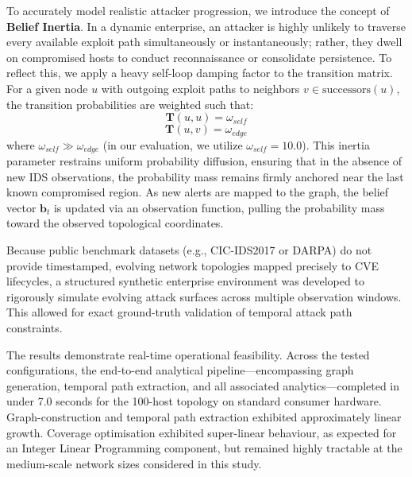 To accurately model realistic attacker progression, we introduce the concept of \textbf{Belief Inertia}. In a dynamic enterprise, an attacker is highly unlikely to traverse every available exploit path simultaneously or instantaneously; rather, they dwell on compromised hosts to conduct reconnaissance or consolidate persistence. To reflect this, we apply a heavy self-loop damping factor to the transition matrix. For a given node $u$ with outgoing exploit paths to neighbors $v \in \text{successors}(u)$, the transition probabilities are weighted such that:
\begin{equation}
    \mathbf{T}(u, u) = \omega_{self}
\end{equation}
\begin{equation}
    \mathbf{T}(u, v) = \omega_{edge}
\end{equation}
where $\omega_{self} \gg \omega_{edge}$ (in our evaluation, we utilize $\omega_{self} = 10.0$). This inertia parameter restrains uniform probability diffusion, ensuring that in the absence of new IDS observations, the probability mass remains firmly anchored near the last known compromised region. As new alerts are mapped to the graph, the belief vector $\mathbf{b}_t$ is updated via an observation function, pulling the probability mass toward the observed topological coordinates.

Because public benchmark datasets (e.g., CIC-IDS2017 or DARPA) do not provide timestamped, evolving network topologies mapped precisely to CVE lifecycles, a structured synthetic enterprise environment was developed to rigorously simulate evolving attack surfaces across multiple observation windows. This allowed for exact ground-truth validation of temporal attack path constraints.

The results demonstrate real-time operational feasibility. Across the tested configurations, the end-to-end analytical pipeline---encompassing graph generation, temporal path extraction, and all associated analytics---completed in under 7.0 seconds for the 100-host topology on standard consumer hardware. Graph-construction and temporal path extraction exhibited approximately linear growth. Coverage optimisation exhibited super-linear behaviour, as expected for an Integer Linear Programming component, but remained highly tractable at the medium-scale network sizes considered in this study.

